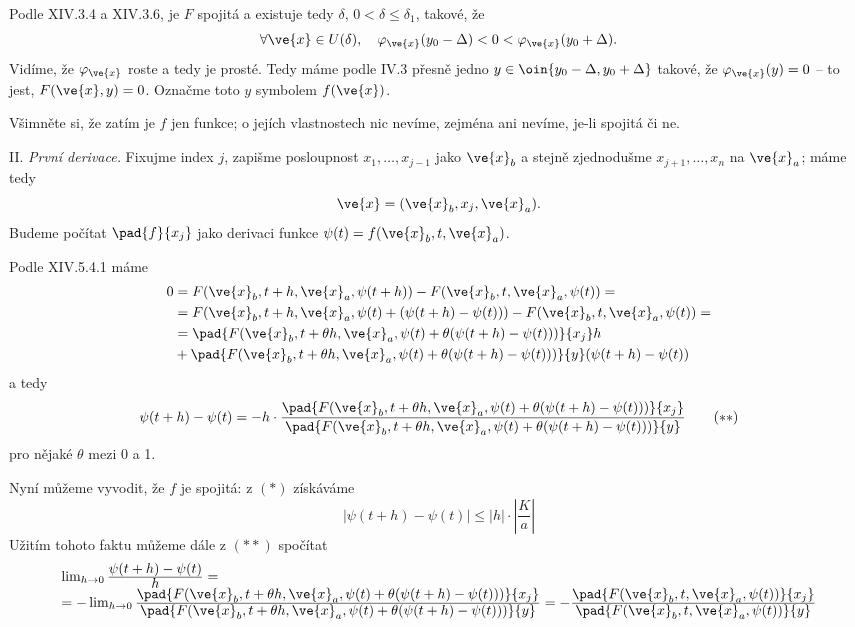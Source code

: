 \documentclass[12pt]{article}
\begin{document}
{\vskip1mm

\noindent Podle XIV.3.4 a XIV.3.6, je $F$ spojitá a existuje tedy  $\delta$, $0<\delta\leq\delta_1$, takové, že
$$
\forall \ve{x}\in U(\delta),\quad \varphi_{\ve{x}}(y_0-\Delta)<0
< \varphi_{\ve{x}}(y_0+\Delta).
$$
Vidíme, že
$\varphi_{\ve{x}}$  roste a tedy je prosté.
Tedy máme podle IV.3 přesně jedno  $y\in\oin{y_0-\Delta,y_0+\Delta}$  takové, že $\varphi_{\ve{x}}(y)=0$ 
-- to jest, $F(\ve{x},y)=0$. Označme toto $y$ symbolem $f(\ve{x})$.

Všimněte si, že zatím je $f$ jen funkce; o jejích vlastnostech nic nevíme, zejména ani nevíme, je-li spojitá či ne.

\smallskip

II. {\em První derivace.} Fixujme index $j$, zapišme
posloupnost $x_1,\dots,x_{j-1}$ jako $\ve{x}_b$ a stejně zjednodušme
$x_{j+1},\dots,x_n$ na $\ve{x}_a$; máme tedy
$$
\ve{x}=(\ve{x}_b,x_j,\ve{x}_a).
$$
Budeme počítat $\pad{f}{x_j}$ jako derivaci funkce $\psi(t)=f(\ve{x}_b,t,\ve{x}_a)$.

Podle XIV.5.4.1 máme
$$
\begin{aligned}
0&=F(\ve{x}_b,t+h,\ve{x}_a,\psi(t+h))-F(\ve{x}_b,t,\ve{x}_a,\psi(t))=\\
&=F(\ve{x}_b,t+h,\ve{x}_a,\psi(t)+(\psi(t+h)-\psi(t)))-F(\ve{x}_b,t,\ve{x}_a,\psi(t))=\\
&=\pad{F(\ve{x}_b,t+\theta h,\ve{x}_a,\psi(t)+\theta(\psi(t+h)-\psi(t)))}{x_j}h\\
&+
\pad{F(\ve{x}_b,t+\theta h,\ve{x}_a,\psi(t)+\theta(\psi(t+h)-\psi(t)))}{y}(\psi(t+h)-\psi(t))
\end{aligned}
$$
a tedy
\begin{equation}
\psi(t+h)-\psi(t)=-h\cdot\frac{\displaystyle\pad{F(\ve{x}_b,t+\theta h,\ve{x}_a,\psi(t)+\theta(\psi(t+h)-\psi(t)))}{x_j}}
{\displaystyle\pad{F(\ve{x}_b,t+\theta h,\ve{x}_a,\psi(t)+\theta(\psi(t+h)-\psi(t)))}{y}}  \tag{$**$}
\end{equation}
pro nějaké $\theta$ mezi 0 a 1.

Nyní můžeme vyvodit, že $f$ je spojitá: z $(*)$ získáváme
$$
|\psi(t+h)-\psi(t)|\leq |h|\cdot\left|\frac{K}{a}\right|
$$
Užitím tohoto faktu můžeme dále z $(**)$ spočítat
$$
\begin{array}{l}\lim_{h\to 0}\frac{\displaystyle\psi(t+h)-\psi(t)}{
\displaystyle h}=\\
=-\lim_{h\to 0}\frac{\displaystyle \pad{F(\ve{x}_b,t+\theta h,\ve{x}_a,\psi(t)+\theta(\psi(t+h)-\psi(t)))}{x_j}}
{\displaystyle\pad{F(\ve{x}_b,t+\theta h,\ve{x}_a,\psi(t)+\theta(\psi(t+h)-\psi(t)))}{y}} =
-\frac{\displaystyle\pad{F(\ve{x}_b,t,\ve{x}_a,\psi(t))}{x_j}}
{\displaystyle\pad{F(\ve{x}_b,t,\ve{x}_a,\psi(t))}{y}}
\end{array}
$$

}
\end{document}
